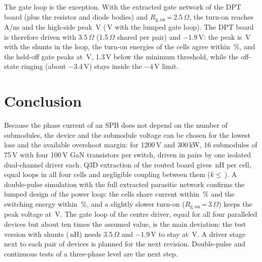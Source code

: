 \documentclass[conference]{IEEEtran}
\begin{document}
The gate loop is the exception. With the extracted gate network of the DPT board (plus the resistor and diode bodies) and $R_\mathrm{g,on}$\,=\,2.5\,$\Omega$, the turn-on reaches \QsDidtDptRgLow\,A/ns and the high-side peak \QsVhDptRgLow\,V (\QsVhDptLump\,V with the lumped gate loop). The DPT board is therefore driven with 3.5\,$\Omega$ (1.5\,$\Omega$ shared per pair) and $-1.9$\,V: the peak is \QsVhDpt\,V with the shunts in the loop, the turn-on energies of the cells agree within \QsShareEonDpt\,\%, and the held-off gate peaks at \QsBumpDpt\,V, 1.3\,V below the minimum threshold, while the off-state ringing (about $-3.4$\,V) stays inside the $-4$\,V limit.

\section{Conclusion}
Because the phase current of an SPB does not depend on the number of submodules, the device and the submodule voltage can be chosen for the lowest loss and the available overshoot margin: for 1200\,V and 300\,kW, 16 submodules of 75\,V with four 100\,V GaN transistors per switch, driven in pairs by one isolated dual-channel driver each. Q3D extraction of the routed board gives \LoopLoad\,nH per cell, equal loops in all four cells and negligible coupling between them ($k\leq$\,\CellKmax). A double-pulse simulation with the full extracted parasitic network confirms the lumped design of the power loop: the cells share current within \QsShareLoad\,\% and the switching energy within \QsShareEonLoad\,\%, and a slightly slower turn-on ($R_\mathrm{g,on}$\,=\,3\,$\Omega$) keeps the peak voltage at \QsVhLoadRgThree\,V. The gate loop of the centre driver, equal for all four paralleled devices but about ten times the assumed value, is the main deviation: the test version with shunts (\LoopDpt\,nH) needs 3.5\,$\Omega$ and $-1.9$\,V to stay at \QsVhDpt\,V. A driver stage next to each pair of devices is planned for the next revision. Double-pulse and continuous tests of a three-phase level are the next step.
\end{document}
